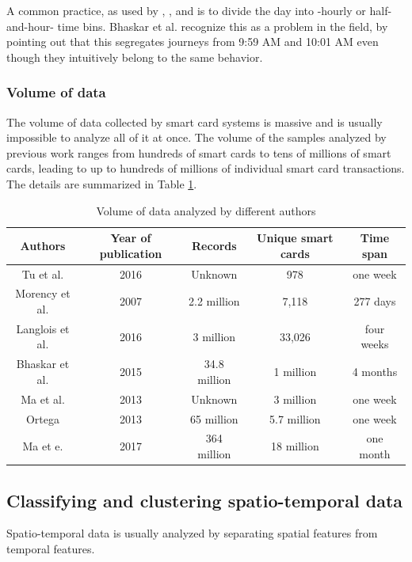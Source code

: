 \documentclass{article}
\begin{document}
A common practice, as used by \cite{ma2017understanding}, \cite{langlois2016inferring}, and \cite{morency2007measuring} is to divide the day into -hourly or half-and-hour- time bins. Bhaskar et al. recognize this as a problem in the field, by pointing out that this segregates journeys from 9:59 AM and 10:01 AM even though they intuitively belong to the same behavior. 

\subsubsection{Volume of data}
The volume of data collected by smart card systems is massive and is usually impossible to analyze all of it at once. The volume of the samples analyzed by previous work ranges from hundreds of smart cards to tens of millions of smart cards, leading to up to hundreds of millions of individual smart card transactions. The details are summarized in Table \ref{table:volumeData}.
 
\begin{table}[H]
\centering
\begin{tabular}{||c c c c c||} 
 \hline
 Authors & Year of publication & Records & Unique smart cards & Time span \\ [0.5ex] 
 \hline\hline
 Tu et al. \cite{tu2016impact} & 2016 & Unknown & 978 & one week \\ 
 Morency et al. \cite{morency2007measuring} & 2007 & 2.2 million & 7,118 & 277 days \\
 Langlois et al. \cite{langlois2016inferring} & 2016 & 3 million & 33,026 & four weeks \\
 Bhaskar et al. \cite{bhaskar2015passenger} & 2015 & 34.8 million & 1 million & 4 months \\ %
 Ma et al. \cite{ma2013mining} & 2013 & Unknown & 3 million & one week \\
 Ortega \cite{ortega2013classification} & 2013 & 65 million & 5.7 million & one week \\
 Ma et e. \cite{ma2017understanding} & 2017 & 364 million & 18 million & one month\\ [1ex] 
 \hline
\end{tabular}
\caption{Volume of data analyzed by different authors}
\label{table:volumeData}
\end{table}


\subsection{Classifying and clustering spatio-temporal data}
Spatio-temporal data is usually analyzed by separating spatial features from temporal features.
\end{document}
